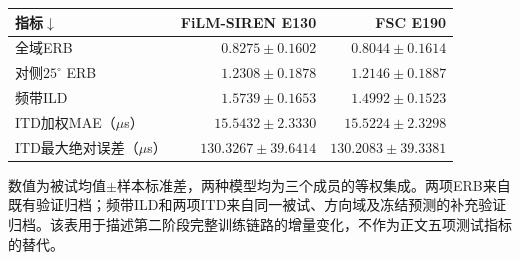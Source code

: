 \begin{table}[htbp]
\centering\small
\setlength{\tabcolsep}{3pt}
\begin{tabular}{lrr}
\toprule
指标$\downarrow$ & FiLM-SIREN E130 & FSC E190\\
\midrule
全域ERB & $0.8275 \pm 0.1602$ & $0.8044 \pm 0.1614$ \\
对侧$25^\circ$ ERB & $1.2308 \pm 0.1878$ & $1.2146 \pm 0.1887$ \\
频带ILD & $1.5739 \pm 0.1653$ & $1.4992 \pm 0.1523$ \\
ITD加权MAE（$\mu$s） & $15.5432 \pm 2.3330$ & $15.5224 \pm 2.3298$ \\
ITD最大绝对误差（$\mu$s） & $130.3267 \pm 39.6414$ & $130.2083 \pm 39.3381$ \\
\bottomrule
\end{tabular}
\par\smallskip
\parbox{\linewidth}{\footnotesize 数值为被试均值$\pm$样本标准差，两种模型均为三个成员的等权集成。两项ERB来自既有验证归档；频带ILD和两项ITD来自同一被试、方向域及冻结预测的补充验证归档。该表用于描述第二阶段完整训练链路的增量变化，不作为正文五项测试指标的替代。}
\end{table}
